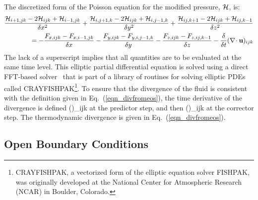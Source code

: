 The discretized form of the
Poisson equation for the modified pressure, ${\cal H}$, is:
\begin{eqnarray}
\frac{{\cal H}_{i+1,jk}-2{\cal H}_{ijk}+{\cal H}_{i-1,jk}}{\delta x^2} +
\frac{{\cal H}_{i,j+1,k}-2{\cal H}_{ijk}+{\cal H}_{i,j-1,k}}{\delta y^2} +
\frac{{\cal H}_{ij,k+1}-2{\cal H}_{ijk}+{\cal H}_{ij,k-1}}{\delta z^2} \nonumber \\ =
    -\frac{F_{x,ijk} - F_{x,i-1,jk}}{\delta x}
    -\frac{F_{y,ijk} - F_{y,i,j-1,k}}{\delta y}
    -\frac{F_{z,ijk} - F_{z,ij,k-1}}{\delta z} - \frac{\delta}{\delta t}(\nabla\!\cdot {\bf u})_{ijk}
\end{eqnarray}
The lack of a superscript implies that all quantities are to be
evaluated at the same time level.
This elliptic partial differential equation is solved using a direct
FFT-based solver~\cite{Sweet:1} that is part of a library of routines
for solving elliptic PDEs called CRAYFISHPAK\footnote{CRAYFISHPAK, a vectorized form of the
elliptic equation solver FISHPAK, was originally developed at the National Center for Atmospheric
Research (NCAR) in Boulder, Colorado.}.
To ensure that the divergence of the fluid is consistent with the definition
given in Eq.~(\ref{eqn_divfromeos}), the time derivative of the divergence is defined
\be {}(\nabla\!\cdot \bu)_{ijk} \equiv
           \ee
at the predictor step, and then
\be {}(\nabla\!\cdot \bu)_{ijk} \equiv
          \ee
at the corrector step. The thermodynamic divergence is
given in Eq.~(\ref{eqn_divfromeos}).


\subsection{Open Boundary Conditions}



